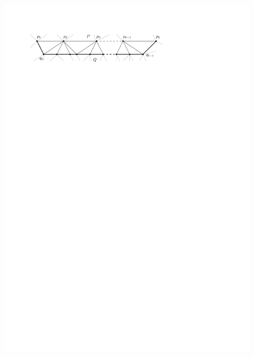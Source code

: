 \documentclass[a4paper]{article}
\begin{document}
\includegraphics[scale=1]{./unifiedAlgo/img/rightNeighbourwalk/neighborPath.pdf}
\clearpage%
\end{document}
